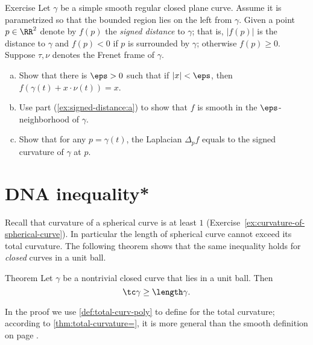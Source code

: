 \begin{thm}{Exercise}\label{ex:signed-distance}
Let $\gamma$ be a simple smooth regular closed plane curve.
Assume it is parametrized so that the bounded region lies on the left from $\gamma$.
Given a point $p\in\RR^2$ denote by $f(p)$ the \emph{signed distance} to $\gamma$;
that is, $|f(p)|$ is the distance to $\gamma$ and $f(p)<0$ if $p$ is surrounded by $\gamma$; otherwise $f(p)\ge0$.
Suppose $\tau,\nu$ denotes the Frenet frame of $\gamma$.

\begin{enumerate}[(a)]
\item\label{ex:signed-distance:a} Show that there is $\eps>0$ such that if $|x|<\eps$, then $f(\gamma(t)+x\cdot \nu(t))=x$.
\item Use part (\ref{ex:signed-distance:a}) to show that $f$ is smooth in the $\eps$-neighborhood of $\gamma$. 
\item Show that for any $p=\gamma(t)$, the Laplacian $\Delta_p f$ equals to the signed curvature of $\gamma$ at $p$.
\end{enumerate}

\end{thm}















\section*{DNA inequality*}

Recall that curvature of a spherical curve is at least $1$
(Exercise~\ref{ex:curvature-of-spherical-curve}).
In particular the length of spherical curve cannot exceed its total curvature.
The following theorem shows that the same inequality holds for \emph{closed} curves in a unit ball.

\begin{thm}{Theorem}\label{thm:DNA}
Let $\gamma$ be a nontrivial closed curve that lies in a unit ball.
Then 
\[\tc\gamma\ge \length\gamma.\]

\end{thm}

In the proof we use \ref{def:total-curv-poly} to define for the total curvature;
according to \ref{thm:total-curvature=}, it is more general than the smooth definition on page \pageref{page:total curvature of:smooth-def}.

